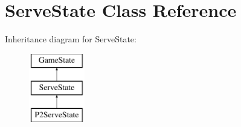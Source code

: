 \hypertarget{class_serve_state}{}\section{Serve\+State Class Reference}
\label{class_serve_state}
Inheritance diagram for Serve\+State\+:\begin{figure}[H]
\begin{center}
\leavevmode
\includegraphics[height=3.000000cm]{class_serve_state}
\end{center}
\end{figure}
